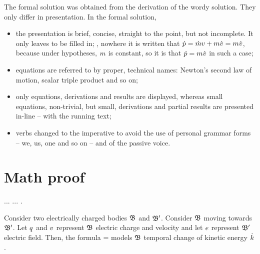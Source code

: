 The formal solution was obtained from the derivation of the wordy solution. They only differ in presentation. In the formal solution,
%
\begin{itemize}
%
\item the presentation is brief, concise, straight to the point, but not incomplete. It only leaves  to be filled in; \eg, nowhere it is written that $\dot{p} = \dot{m}v + m\dot{v} = m\dot{v}$, because under hypotheses, $m$ is constant, so it is  that $\dot{p} = m\dot{v}$ in such a case;
%
\item equations are referred to by proper, technical names: Newton's second law of motion, scalar triple product and so on;
%
\item only  equations, derivations and results are displayed, whereas small equations, non-trivial, but small, derivations and partial results are presented in-line -- with the running text;
%
\item verbs changed to the imperative to avoid the use of personal grammar forms -- we, us, one and so on -- and of the passive voice.
%
\end{itemize}


\section{Math proof}
%
... \cite[chap. 1]{lehman:2011} ... \cite{houston:2009}.

Consider two electrically charged bodies $\mathfrak{B}$ and $\mathfrak{B}'$. Consider $\mathfrak{B}$ moving towards $\mathfrak{B}'$. Let $q$ and $v$ represent $\mathfrak{B}$ electric charge and velocity and let $e$ represent $\mathfrak{B}'$ electric field. Then, the formula
%
\beq
  \dt\ekin = \echarge\efield\iprod\vel
\eeq
%
models $\mathfrak{B}$ temporal change of kinetic energy $\dot{k}$.


